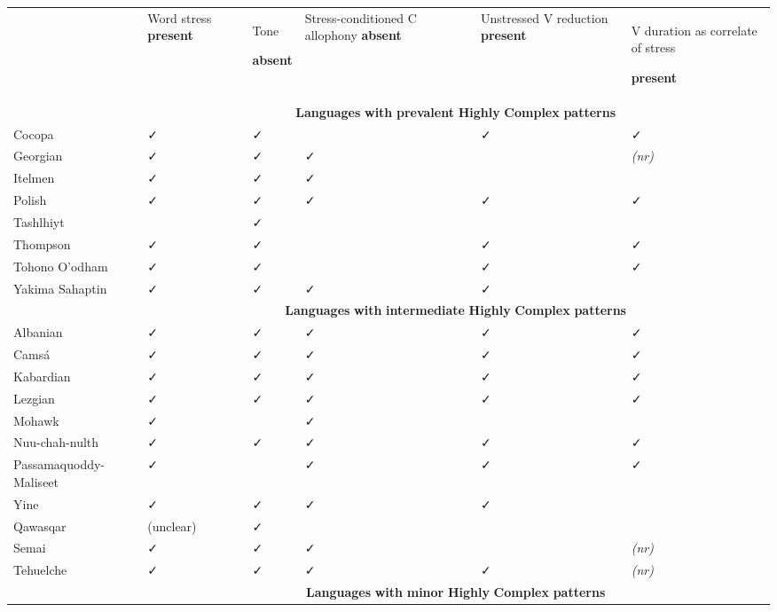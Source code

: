 \begin{table}
\begin{tabularx}{\textwidth}{XXXXXX}
\lsptoprule
 & Word stress \textbf{present} & { Tone} 

 \textbf{absent} & Stress-conditioned C allophony \textbf{absent} & Unstressed V reduction \textbf{present} & { V duration  as correlate of stress} 

 \textbf{present}\\
& \multicolumn{5}{c}{ \textbf{Languages} \textbf{with} \textbf{prevalent} \textbf{Highly} \textbf{Complex} \textbf{patterns}}\\
\hhline{~-----}
 Cocopa & ✓ & ✓ &  & ✓ & ✓\\
\hhline{~-----}
 Georgian & ✓ & ✓ & { ✓} &  & \textit{(nr)}\\
\hhline{~-----}
 Itelmen & ✓ & ✓ & { ✓} &  & \\
\hhline{~-----}
 Polish & ✓ & ✓ & ✓ & ✓ & ✓\\
\hhline{~-----}
 Tashlhiyt &  & ✓ & {} &  & \\
\hhline{~-----}
 Thompson & ✓ & ✓ & {} & ✓ & ✓\\
\hhline{~-----}
 Tohono O’odham & ✓ & ✓ & {} & ✓ & ✓\\
\hhline{~-----}
 Yakima Sahaptin & ✓ & ✓ & ✓ & ✓ & \\
& \multicolumn{5}{c}{ \textbf{Languages} \textbf{with} \textbf{intermediate} \textbf{Highly} \textbf{Complex} \textbf{patterns}}\\
\hhline{~-----}
 Albanian & ✓ & ✓ & ✓ & ✓ & ✓\\
\hhline{~-----}
 Camsá & ✓ & ✓ & ✓ & ✓ & ✓\\
\hhline{~-----}
 Kabardian & ✓ & ✓ & ✓ & ✓ & ✓\\
\hhline{~-----}
 Lezgian & ✓ & ✓ & ✓ & ✓ & ✓\\
\hhline{~-----}
 Mohawk & ✓ &  & ✓ &  & \\
\hhline{~-----}
 Nuu-chah-nulth & ✓ & ✓ & ✓ & ✓ & ✓\\
\hhline{~-----}
 Passamaquoddy-Maliseet & ✓ &  & ✓ & ✓ & ✓\\
\hhline{~-----}
 Yine & ✓ & ✓ & ✓ & ✓ & \\
\hhline{~-----}
 Qawasqar & (unclear) & ✓ &  &  & \\
\hhline{~-----}
 Semai & ✓ & ✓ & ✓ &  & \textit{(nr)}\\
\hhline{~-----}
 Tehuelche & ✓ & ✓ & ✓ & ✓ & \textit{(nr)}\\
& \multicolumn{5}{c}{ \textbf{Languages} \textbf{with} \textbf{minor} \textbf{Highly} \textbf{Complex} \textbf{patterns}}\\

\end{tabularx}
\end{table}
